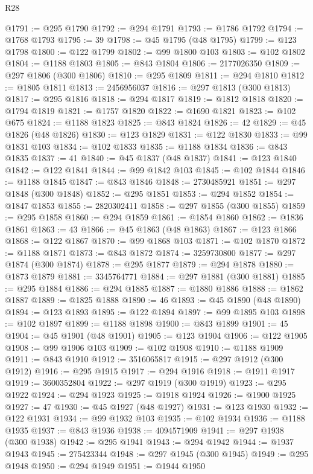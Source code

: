 \begin{lexlean}{R28}
\begin{coremodule}
@1791 := @295 @1790
@1792 := @294 @1791
@1793 := @1786 @1792
@1794 := @1768 @1793
@1795 := 39
@1798 := @45 @1795 (@48 @1795)
@1799 := @123 @1798
@1800 := @122 @1799
@1802 := @99 @1800 @103
@1803 := @102 @1802
@1804 := @1188 @1803
@1805 := @843 @1804
@1806 := 2177026350
@1809 := @297 @1806 (@300 @1806)
@1810 := @295 @1809
@1811 := @294 @1810
@1812 := @1805 @1811
@1813 := 2456956037
@1816 := @297 @1813 (@300 @1813)
@1817 := @295 @1816
@1818 := @294 @1817
@1819 := @1812 @1818
@1820 := @1794 @1819
@1821 := @1757 @1820
@1822 := @1690 @1821
@1823 := @102 @675
@1824 := @1188 @1823
@1825 := @843 @1824
@1826 := 42
@1829 := @45 @1826 (@48 @1826)
@1830 := @123 @1829
@1831 := @122 @1830
@1833 := @99 @1831 @103
@1834 := @102 @1833
@1835 := @1188 @1834
@1836 := @843 @1835
@1837 := 41
@1840 := @45 @1837 (@48 @1837)
@1841 := @123 @1840
@1842 := @122 @1841
@1844 := @99 @1842 @103
@1845 := @102 @1844
@1846 := @1188 @1845
@1847 := @843 @1846
@1848 := 2730485921
@1851 := @297 @1848 (@300 @1848)
@1852 := @295 @1851
@1853 := @294 @1852
@1854 := @1847 @1853
@1855 := 2820302411
@1858 := @297 @1855 (@300 @1855)
@1859 := @295 @1858
@1860 := @294 @1859
@1861 := @1854 @1860
@1862 := @1836 @1861
@1863 := 43
@1866 := @45 @1863 (@48 @1863)
@1867 := @123 @1866
@1868 := @122 @1867
@1870 := @99 @1868 @103
@1871 := @102 @1870
@1872 := @1188 @1871
@1873 := @843 @1872
@1874 := 3259730800
@1877 := @297 @1874 (@300 @1874)
@1878 := @295 @1877
@1879 := @294 @1878
@1880 := @1873 @1879
@1881 := 3345764771
@1884 := @297 @1881 (@300 @1881)
@1885 := @295 @1884
@1886 := @294 @1885
@1887 := @1880 @1886
@1888 := @1862 @1887
@1889 := @1825 @1888
@1890 := 46
@1893 := @45 @1890 (@48 @1890)
@1894 := @123 @1893
@1895 := @122 @1894
@1897 := @99 @1895 @103
@1898 := @102 @1897
@1899 := @1188 @1898
@1900 := @843 @1899
@1901 := 45
@1904 := @45 @1901 (@48 @1901)
@1905 := @123 @1904
@1906 := @122 @1905
@1908 := @99 @1906 @103
@1909 := @102 @1908
@1910 := @1188 @1909
@1911 := @843 @1910
@1912 := 3516065817
@1915 := @297 @1912 (@300 @1912)
@1916 := @295 @1915
@1917 := @294 @1916
@1918 := @1911 @1917
@1919 := 3600352804
@1922 := @297 @1919 (@300 @1919)
@1923 := @295 @1922
@1924 := @294 @1923
@1925 := @1918 @1924
@1926 := @1900 @1925
@1927 := 47
@1930 := @45 @1927 (@48 @1927)
@1931 := @123 @1930
@1932 := @122 @1931
@1934 := @99 @1932 @103
@1935 := @102 @1934
@1936 := @1188 @1935
@1937 := @843 @1936
@1938 := 4094571909
@1941 := @297 @1938 (@300 @1938)
@1942 := @295 @1941
@1943 := @294 @1942
@1944 := @1937 @1943
@1945 := 275423344
@1948 := @297 @1945 (@300 @1945)
@1949 := @295 @1948
@1950 := @294 @1949
@1951 := @1944 @1950

\end{coremodule}
\end{lexlean}
